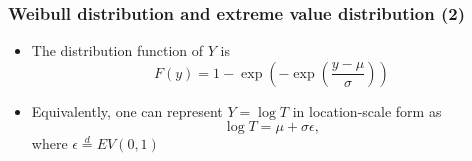 \documentclass{beamer}
\begin{document}
\begin{frame} \frametitle{Weibull distribution and extreme value distribution (2)}

\begin{itemize}

\item The distribution function of $Y$ is
\[
F(y) = 1 - \exp\left(  - \exp\left(   \frac{ y- \mu}{\sigma} \right) \right)
\]

\item Equivalently, one can represent $Y = \log T$ in  location-scale  form as
\begin{equation} \label{log_weibull_location_scale_form}
\log T = \mu + \sigma \epsilon,
\end{equation}
where $\epsilon \stackrel{d}{=} EV(0, 1)$
\end{itemize}


\end{frame}
\end{document}
